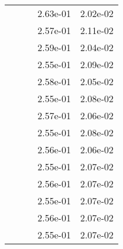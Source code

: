 \begin{table}
\begin{tabular}{c|cc|cc|}
\multicolumn{1}{|c|}{} & \multicolumn{1}{|c|}{} & \multicolumn{1}{|c|}{} & \multicolumn{1}{|c|}{  2.63e-01} & \multicolumn{1}{|c|}{  2.02e-02} \\ 
\multicolumn{1}{|c|}{} & \multicolumn{1}{|c|}{} & \multicolumn{1}{|c|}{} & \multicolumn{1}{|c|}{  2.57e-01} & \multicolumn{1}{|c|}{  2.11e-02} \\ 
\multicolumn{1}{|c|}{} & \multicolumn{1}{|c|}{} & \multicolumn{1}{|c|}{} & \multicolumn{1}{|c|}{  2.59e-01} & \multicolumn{1}{|c|}{  2.04e-02} \\ 
\multicolumn{1}{|c|}{} & \multicolumn{1}{|c|}{} & \multicolumn{1}{|c|}{} & \multicolumn{1}{|c|}{  2.55e-01} & \multicolumn{1}{|c|}{  2.09e-02} \\ 
\multicolumn{1}{|c|}{} & \multicolumn{1}{|c|}{} & \multicolumn{1}{|c|}{} & \multicolumn{1}{|c|}{  2.58e-01} & \multicolumn{1}{|c|}{  2.05e-02} \\ 
\multicolumn{1}{|c|}{} & \multicolumn{1}{|c|}{} & \multicolumn{1}{|c|}{} & \multicolumn{1}{|c|}{  2.55e-01} & \multicolumn{1}{|c|}{  2.08e-02} \\ 
\multicolumn{1}{|c|}{} & \multicolumn{1}{|c|}{} & \multicolumn{1}{|c|}{} & \multicolumn{1}{|c|}{  2.57e-01} & \multicolumn{1}{|c|}{  2.06e-02} \\ 
\multicolumn{1}{|c|}{} & \multicolumn{1}{|c|}{} & \multicolumn{1}{|c|}{} & \multicolumn{1}{|c|}{  2.55e-01} & \multicolumn{1}{|c|}{  2.08e-02} \\ 
\multicolumn{1}{|c|}{} & \multicolumn{1}{|c|}{} & \multicolumn{1}{|c|}{} & \multicolumn{1}{|c|}{  2.56e-01} & \multicolumn{1}{|c|}{  2.06e-02} \\ 
\multicolumn{1}{|c|}{} & \multicolumn{1}{|c|}{} & \multicolumn{1}{|c|}{} & \multicolumn{1}{|c|}{  2.55e-01} & \multicolumn{1}{|c|}{  2.07e-02} \\ 
\multicolumn{1}{|c|}{} & \multicolumn{1}{|c|}{} & \multicolumn{1}{|c|}{} & \multicolumn{1}{|c|}{  2.56e-01} & \multicolumn{1}{|c|}{  2.07e-02} \\ 
\multicolumn{1}{|c|}{} & \multicolumn{1}{|c|}{} & \multicolumn{1}{|c|}{} & \multicolumn{1}{|c|}{  2.55e-01} & \multicolumn{1}{|c|}{  2.07e-02} \\ 
\multicolumn{1}{|c|}{} & \multicolumn{1}{|c|}{} & \multicolumn{1}{|c|}{} & \multicolumn{1}{|c|}{  2.56e-01} & \multicolumn{1}{|c|}{  2.07e-02} \\ 
\multicolumn{1}{|c|}{} & \multicolumn{1}{|c|}{} & \multicolumn{1}{|c|}{} & \multicolumn{1}{|c|}{  2.55e-01} & \multicolumn{1}{|c|}{  2.07e-02} \\ 

\end{tabular}
\end{table}
